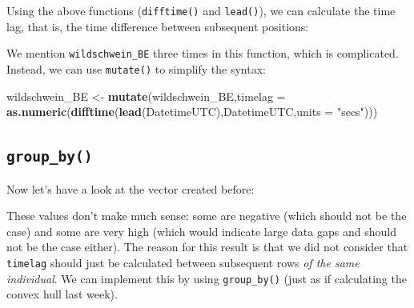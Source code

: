 \documentclass[]{book}
\newenvironment{Shaded}{\begin{snugshade}}{\end{snugshade}}
\newcommand{\KeywordTok}[1]{\textcolor[rgb]{0.13,0.29,0.53}{\textbf{#1}}}
\newcommand{\DataTypeTok}[1]{\textcolor[rgb]{0.13,0.29,0.53}{#1}}
\newcommand{\StringTok}[1]{\textcolor[rgb]{0.31,0.60,0.02}{#1}}
\newcommand{\OperatorTok}[1]{\textcolor[rgb]{0.81,0.36,0.00}{\textbf{#1}}}
\newcommand{\NormalTok}[1]{#1}
\begin{document}
Using the above functions (\texttt{difftime()} and \texttt{lead()}), we
can calculate the time lag, that is, the time difference between
subsequent positions:

\begin{Shaded}
\end{Shaded}

We mention \texttt{wildschwein\_BE} three times in this function, which
is complicated. Instead, we can use \texttt{mutate()} to simplify the
syntax:

\begin{Shaded}
\begin{Highlighting}[]
\NormalTok{wildschwein_BE <-}\StringTok{ }\KeywordTok{mutate}\NormalTok{(wildschwein_BE,}\DataTypeTok{timelag =} \KeywordTok{as.numeric}\NormalTok{(}\KeywordTok{difftime}\NormalTok{(}\KeywordTok{lead}\NormalTok{(DatetimeUTC),DatetimeUTC,}\DataTypeTok{units =} \StringTok{"secs"}\NormalTok{)))}
\end{Highlighting}
\end{Shaded}

\subsection{\texorpdfstring{\texttt{group\_by()}}{group\_by()}}\label{group_by}

Now let's have a look at the vector created before:

\begin{Shaded}
\end{Shaded}

These values don't make much sense: some are negative (which should not
be the case) and some are very high (which would indicate large data
gaps and should not be the case either). The reason for this result is
that we did not consider that \texttt{timelag} should just be calculated
between subsequent rows \emph{of the same individual}. We can implement
this by using \texttt{group\_by()} (just as if calculating the convex
hull last week).
\end{document}
